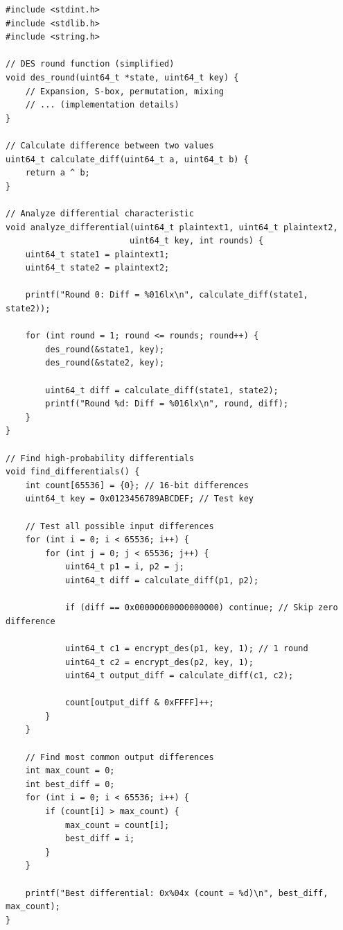 \begin{lstlisting}[style=cstyle, caption={Differential Cryptanalysis Framework}]
#include <stdint.h>
#include <stdlib.h>
#include <string.h>

// DES round function (simplified)
void des_round(uint64_t *state, uint64_t key) {
    // Expansion, S-box, permutation, mixing
    // ... (implementation details)
}

// Calculate difference between two values
uint64_t calculate_diff(uint64_t a, uint64_t b) {
    return a ^ b;
}

// Analyze differential characteristic
void analyze_differential(uint64_t plaintext1, uint64_t plaintext2, 
                         uint64_t key, int rounds) {
    uint64_t state1 = plaintext1;
    uint64_t state2 = plaintext2;
    
    printf("Round 0: Diff = %016lx\n", calculate_diff(state1, state2));
    
    for (int round = 1; round <= rounds; round++) {
        des_round(&state1, key);
        des_round(&state2, key);
        
        uint64_t diff = calculate_diff(state1, state2);
        printf("Round %d: Diff = %016lx\n", round, diff);
    }
}

// Find high-probability differentials
void find_differentials() {
    int count[65536] = {0}; // 16-bit differences
    uint64_t key = 0x0123456789ABCDEF; // Test key
    
    // Test all possible input differences
    for (int i = 0; i < 65536; i++) {
        for (int j = 0; j < 65536; j++) {
            uint64_t p1 = i, p2 = j;
            uint64_t diff = calculate_diff(p1, p2);
            
            if (diff == 0x00000000000000000) continue; // Skip zero difference
            
            uint64_t c1 = encrypt_des(p1, key, 1); // 1 round
            uint64_t c2 = encrypt_des(p2, key, 1);
            uint64_t output_diff = calculate_diff(c1, c2);
            
            count[output_diff & 0xFFFF]++;
        }
    }
    
    // Find most common output differences
    int max_count = 0;
    int best_diff = 0;
    for (int i = 0; i < 65536; i++) {
        if (count[i] > max_count) {
            max_count = count[i];
            best_diff = i;
        }
    }
    
    printf("Best differential: 0x%04x (count = %d)\n", best_diff, max_count);
}
\end{lstlisting}

